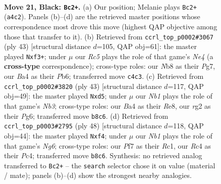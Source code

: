 \documentclass[11pt]{article}
\begin{document}
\clearpage

\begin{figure}[p]\centering
\begin{subfigure}{0.46\textwidth}\centering
\resizebox{\linewidth}{!}{%
\newchessgame
\chessboard[
  setfen={rn4k1/pQ3ppp/4p3/8/b1r1P2P/4nN2/PP1N2R1/RK6 b - - 0 21},
  showmover=false,
  pgfstyle=straightmove, color=movearrow, markmove={a4-c2}
]}
\caption{}
\end{subfigure}\hfill
\begin{subfigure}{0.46\textwidth}\centering
\resizebox{\linewidth}{!}{%
\newchessgame
\chessboard[
  setfen={5rk1/4Q1pp/1p2pp2/4n3/3PP3/b2B1N2/5PPP/5RK1 b - - 0 22},
  showmover=false,
  pgfstyle=straightmove, color=movearrow, markmove={e5-f3}
]}
\caption{}
\end{subfigure}
\\[4pt]
\begin{subfigure}{0.46\textwidth}\centering
\resizebox{\linewidth}{!}{%
\newchessgame
\chessboard[
  setfen={3rr1k1/ppQ2p1p/1n4p1/3P1q2/3R4/2N5/PP3PPP/3R2K1 b - - 0 22},
  showmover=false,
  pgfstyle=straightmove, color=movearrow, markmove={b6-d5}
]}
\caption{}
\end{subfigure}\hfill
\begin{subfigure}{0.46\textwidth}\centering
\resizebox{\linewidth}{!}{%
\newchessgame
\chessboard[
  setfen={r2nr1k1/1p2p2p/4bpN1/p6P/2P1Bq2/6P1/3RPP2/2R3K1 w - - 0 25},
  showmover=false,
  pgfstyle=straightmove, color=movearrow, markmove={g6-f4}
]}
\caption{}
\end{subfigure}
\caption{\textbf{Move 21, Black: \texttt{Bc2+}.} (a) Our position; Melanie plays \texttt{Bc2+} (\texttt{a4c2}). Panels (b)--(d) are the retrieved master positions whose correspondence most drove this move (highest QAP objective among those that transfer to it). (b) Retrieved from \texttt{ccrl\_top\_p0002\#3067} (ply 43) [structural distance $d$=105, QAP obj=61]: the master played \texttt{Nxf3+}; under $\mu$ our \emph{Rc5} plays the role of that game's \emph{Ne4} (a \textbf{cross-type} correspondence); cross-type roles: our \emph{N}b8 as their \emph{P}g7, our \emph{B}a4 as their \emph{P}b6; transferred move \texttt{c4c3}. (c) Retrieved from \texttt{ccrl\_top\_p0002\#3820} (ply 43) [structural distance $d$=117, QAP obj=49]: the master played \texttt{Nxd5}; under $\mu$ our \emph{Nb1} plays the role of that game's \emph{Nb3}; cross-type roles: our \emph{B}a4 as their \emph{R}e8, our \emph{r}g2 as their \emph{P}g6; transferred move \texttt{b8c6}. (d) Retrieved from \texttt{ccrl\_top\_p0003\#2795} (ply 48) [structural distance $d$=118, QAP obj=44]: the master played \texttt{Nxf4}; under $\mu$ our \emph{Nb1} plays the role of that game's \emph{Ng6}; cross-type roles: our \emph{P}f7 as their \emph{R}c1, our \emph{R}c4 as their \emph{P}c4; transferred move \texttt{b8c6}. Synthesis: no retrieved analog transferred to \texttt{Bc2+} -- the \texttt{search} selector chose it on value (material / mate); panels (b)--(d) show the strongest nearby analogies.}
\label{fig:thought-m41}
\end{figure}
\end{document}
